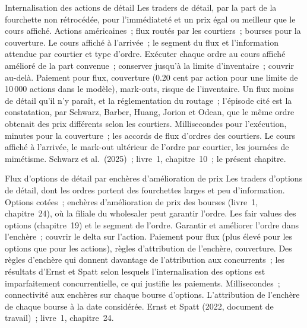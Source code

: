 \begin{strategyfile}{Internalisation des actions de détail}\label{strat:hf:retail-wholesaling:equity}
 Les traders de détail, par la part de la fourchette non rétrocédée, pour l'immédiateté et un prix égal ou meilleur que le cours affiché.
 Actions américaines~; flux routés par les courtiers~; bourses pour la couverture.
 Le cours affiché à l'arrivée~; le segment du flux et l'information attendue par courtier et type d'ordre.
 Exécuter chaque ordre au cours affiché amélioré de la part convenue~; conserver jusqu'à la limite d'inventaire~; couvrir au-delà.
 Paiement pour flux, couverture (0.20 cent par action pour une limite de 10\,000 actions dans le modèle), mark-outs, risque de l'inventaire.
 Un flux moins de détail qu'il n'y paraît, et la réglementation du routage~; l'épisode cité est la constatation, par Schwarz, Barber, Huang, Jorion et
Odean, que le même ordre obtenait des prix différents selon les courtiers.
 Millisecondes pour l'exécution, minutes pour la couverture~; les accords de flux d'ordres des courtiers.
 Le cours affiché à l'arrivée, le mark-out ultérieur de l'ordre par courtier, les journées de mimétisme.
 Schwarz et al.\ (2025)~; livre~1, chapitre~10~; le présent chapitre.
\end{strategyfile}

\begin{strategyfile}{Flux d'options de détail par enchères d'amélioration de prix}\label{strat:hf:retail-wholesaling:options}
 Les traders d'options de détail, dont les ordres portent des fourchettes larges et peu d'information.
 Options cotées~; enchères d'amélioration de prix des bourses (livre~1, chapitre~24), où la filiale du wholesaler peut
garantir l'ordre.
 Les fair values des options (chapitre~19) et le segment de l'ordre.
 Garantir et améliorer l'ordre dans l'enchère~; couvrir le delta sur l'action.
 Paiement pour flux (plus élevé pour les options que pour les actions), règles d'attribution de l'enchère, couverture.
 Des règles d'enchère qui donnent davantage de l'attribution aux concurrents~; les résultats d'Ernst et Spatt selon lesquels l'internalisation des options est
imparfaitement concurrentielle, ce qui justifie les paiements.
 Millisecondes~; connectivité aux enchères sur chaque bourse d'options.
 L'attribution de l'enchère de chaque bourse à la date considérée.
 Ernst et Spatt (2022, document de travail)~; livre~1, chapitre~24.
\end{strategyfile}


